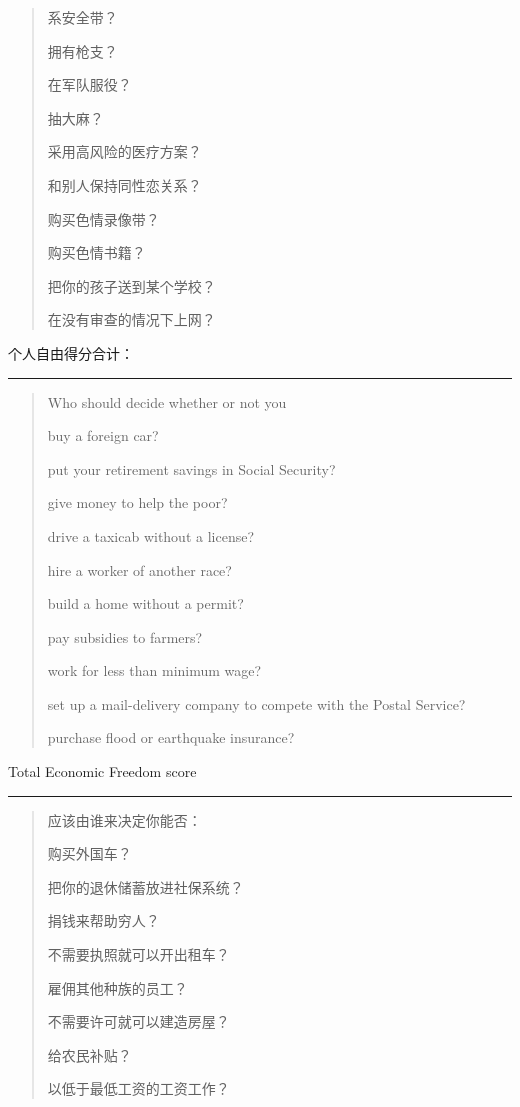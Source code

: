 \begin{paracol}{2}
\begin{quotation}
系安全带？

拥有枪支？

在军队服役？

抽大麻？

采用高风险的医疗方案？

和别人保持同性恋关系？

购买色情录像带？

购买色情书籍？

把你的孩子送到某个学校？

在没有审查的情况下上网？
\end{quotation}

\noindent 个人自由得分合计：\rule[0pt]{2cm}{0.5pt}

\begin{quotation}
\noindent Who should decide whether or not you 

buy a foreign car?

put your retirement savings in Social Security?

give money to help the poor?

drive a taxicab without a license?

hire a worker of another race?

build a home without a permit?

pay subsidies to farmers?

work for less than minimum wage?

set up a mail-delivery company to compete with the Postal Service?

purchase flood or earthquake insurance?
\end{quotation}

\noindent Total Economic Freedom score\rule[0pt]{2cm}{0.5pt}
\switchcolumn
\begin{quotation}
\noindent 应该由谁来决定你能否：

购买外国车？

把你的退休储蓄放进社保系统？

捐钱来帮助穷人？

不需要执照就可以开出租车？

雇佣其他种族的员工？

不需要许可就可以建造房屋？

给农民补贴？

以低于最低工资的工资工作？


\end{quotation}
\end{paracol}
